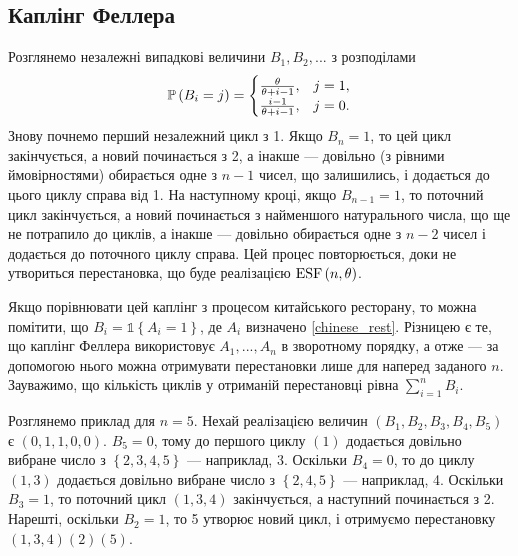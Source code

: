 \subsection{Каплінг Феллера}
Розглянемо  незалежні випадкові величини
$B_1, B_2, ...$ з розподілами
\begin{gather}
    \P{B_i = j} = \begin{cases}
        \frac{\theta}{\theta + i - 1}, & j = 1, \\
        \frac{i - 1}{\theta + i - 1}, & j = 0.
    \end{cases}
\end{gather}
Знову почнемо перший незалежний цикл з 1. Якщо $B_n = 1$,
то цей цикл закінчується, а новий починається з 2, а інакше ---
довільно (з рівними ймовірностями) обирається одне з $n-1$ чисел,
що залишились, і додається до цього циклу справа від 1.
На наступному кроці, якщо $B_{n-1} = 1$, то поточний цикл
закінчується, а новий починається з найменшого
натурального числа, що ще не потрапило до циклів, а інакше ---
довільно обирається одне з $n-2$ чисел і додається до поточного циклу справа.
Цей процес повторюється, доки не утвориться перестановка,
що буде реалізацією $\ESF{n, \theta}$.

Якщо порівнювати цей каплінг з процесом китайського ресторану,
то можна помітити, що $B_i = \mathds{1}\left\{A_i = 1\right\}$, де
$A_i$ визначено \eqref{chinese_rest}. Різницею є те, що
каплінг Феллера використовує $A_1,...,A_n$ в зворотному порядку, 
а отже --- за допомогою нього можна отримувати 
перестановки лише для наперед заданого $n$. Зауважимо, що кількість
циклів у отриманій перестановці рівна $\sum_{i=1}^n B_i$. 

Розглянемо приклад для $n = 5$. Нехай реалізацією величин $(B_1, B_2, B_3, B_4, B_5)$ є
$(0, 1, 1, 0, 0)$. $B_5 = 0$, тому до першого циклу $(1)$ додається довільно вибране
число з $\left\{2,3,4,5\right\}$ --- наприклад, $3$. Оскільки $B_4 = 0$, то до циклу
$(1, 3)$ додається довільно вибране число з $\left\{2, 4, 5\right\}$ --- наприклад, 4.
Оскільки $B_3 = 1$, то поточний цикл $(1, 3, 4)$ закінчується, а наступний починається з 2.
Нарешті, оскільки $B_2 = 1$, то 5 утворює новий цикл, і отримуємо
перестановку $(1, 3, 4) (2) (5)$.